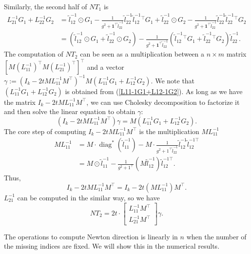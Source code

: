 \documentclass[final,onefignum,onetabnum]{siamart190516}
\begin{document}
Similarly, the second half of $NT_1$ is
\begin{equation}
    \begin{aligned}
            L^{-1}_{21} G_1 + L^{-1}_{22} G_2 &= \widetilde{l}^{-1}_{12} \odot G_1 - \frac{1}{g^2+\mathbf{1}^\top \widetilde{l}^{-1}_{22}}\widetilde{l}^{-1}_{22}\widetilde{l}^{-1}_{12}^\top G_1 + 
            \widetilde{l}^{-1}_{22} \odot G_2 - \frac{1}{g^2+\mathbf{1}^\top \widetilde{l}^{-1}_{22}}\widetilde{l}^{-1}_{22}\widetilde{l}^{-1}_{22}^\top G_2\\
            & = \left(\widetilde{l}^{-1}_{12} \odot G_1 +\widetilde{l}^{-1}_{22} \odot G_2 \right) - \frac{1}{g^2+\mathbf{1}^\top \widetilde{l}^{-1}_{22}}\left(\widetilde{l}^{-1}_{12}^\top G_1 + \widetilde{l}^{-1}_{22}^\top G_2\right)\widetilde{l}^{-1}_{22}.
    \end{aligned}
\end{equation}
The computation of $NT_2$ can be seen as a multiplication between a $n\times m$ matrix $[M(L_{11}^{-1})^{\top} M(L_{21}^{-1})^{\top}]^{\top}$ and a vector $\gamma := \left(I_k-2t M L^{-1}_{11} M^\top\right)^{-1}M\left(L^{-1}_{11} G_1 + L^{-1}_{12} G_2\right)$. We note that $\left(L^{-1}_{11} G_1 + L^{-1}_{12} G_2\right)$ is obtained from (\ref{L11-1G1+L12-1G2}). As long as we have the matrix $I_k-2t M L^{-1}_{11} M^\top$, we can use Cholesky decomposition to factorize it and then solve the linear equation to obtain $\gamma$:
\begin{equation}
    \left(I_k-2t M L^{-1}_{11} M^\top\right)\gamma = M\left(L^{-1}_{11} G_1 + L^{-1}_{12} G_2\right).
\end{equation}
The core step of computing $I_k-2t M L^{-1}_{11} M^\top$ is the multiplication $M L^{-1}_{11}$
\begin{equation}
    \begin{aligned}
             M L^{-1}_{11} &= M\cdot \operatorname{diag}^{*}\left(\widetilde{l}_{11}^{-1}\right)-M\cdot\frac{1}{g^{2}+1^{\top} \widetilde{l}_{22}^{-1}} \widetilde{l}_{12}^{-1} \widetilde{l}_{12}^{-1 \top}   \\
    &= M\odot \widetilde{l}_{11}^{-1} - \frac{1}{g^{2}+1^{\top}} \left(M\widetilde{l}_{12}^{-1}\right)\widetilde{l}_{12}^{-1 \top}.
    \end{aligned}
\end{equation}
Thus,
\begin{equation}
 I_k-2t M L^{-1}_{11} M^\top = I_k-2t \left(M L^{-1}_{11}\right) M^\top.  \end{equation}
 $L_{21}^{-1}$ can be computed in the similar way, so we have
 \begin{equation}
      NT_2 = 2t\cdot \begin{bmatrix} L^{-1}_{11}M^\top\\L^{-1}_{21}M^\top  \end{bmatrix} \gamma.
 \end{equation}
 \begin{remark}
 The operations to compute Newton direction is linearly in $n$ when the number of the missing indices are fixed. We will show this in the numerical results.
 \end{remark}
\end{document}
